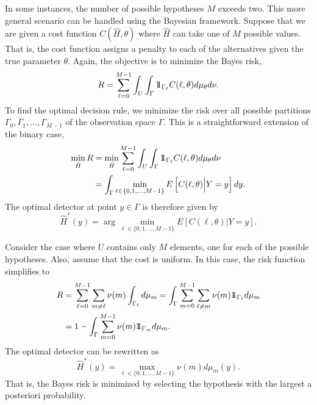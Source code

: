 In some instances, the number of possible hypotheses $M$ exceeds two.
This more general scenario can be handled using the Bayesian framework.
Suppose that we are given a cost function $C(\hat{H}, \theta)$ where $\hat{H}$ can take one of $M$ possible values.
That is, the cost function assigns a penalty to each of the alternatives given the true parameter $\theta$.
Again, the objective is to minimize the Bayes risk,
\begin{equation*}
R = \sum_{\ell = 0}^{M-1} \int_U \int_{\Gamma} \mathrm{1\!\!1}_{\Gamma_{\ell}}
C(\ell, \theta) d\mu_{\theta} d\nu .
\end{equation*}
To find the optimal decision rule, we minimize the risk over all possible partitions $\Gamma_0, \Gamma_1, \ldots, \Gamma_{M-1}$ of the observation space $\Gamma$.
This is a straightforward extension of the binary case,
\begin{equation*}
\begin{split}
\min_{\hat{H}} R
&= \min_{\hat{H}} \sum_{\ell = 0}^{M-1}
\int_U \int_{\Gamma} \mathrm{1\!\!1}_{\Gamma_{\ell}}
C(\ell, \theta) d\mu_{\theta} d\nu \\
&= \int_{\Gamma} \min_{\ell \in \{0, 1, \ldots, M-1 \} }
E \left[ C(\ell, \theta) \Big| Y = y \right] dy .
\end{split}
\end{equation*}
The optimal detector at point $y \in \Gamma$ is therefore given by
\begin{equation*}
\hat{H}^* (y) = \arg \min_{\ell \in \{ 0, 1, \ldots, M-1 \} }
E \left[ C(\ell, \theta) \Big| Y = y \right] .
\end{equation*}

Consider the case where $U$ contains only $M$ elements, one for each of the possible hypotheses.
Also, assume that the cost is uniform.
In this case, the risk function simplifies to
\begin{equation*}
\begin{split}
R &= \sum_{\ell = 0}^{M-1} \sum_{m \neq \ell} \nu(m)
\int_{\Gamma_{\ell}} d\mu_{m}
= \int_{\Gamma} \sum_{m = 0}^{M-1} \sum_{\ell \neq m} \nu(m)
\mathrm{1\!\!1}_{\Gamma_{\ell}} d\mu_{m} \\
&= 1 - \int_{\Gamma} \sum_{m = 0}^{M-1} \nu(m)
\mathrm{1\!\!1}_{\Gamma_{m}} d\mu_{m} .
\end{split}
\end{equation*}
The optimal detector can be rewritten as
\begin{equation*}
\hat{H}^* (y) = \max_{\ell \in \{ 0, 1, \ldots, M-1 \} } \nu(m) d\mu_m (y).
\end{equation*}
That is, the Bayes risk is minimized by selecting the hypothesis with the largest a posteriori probability.

